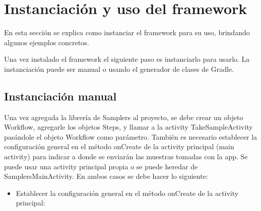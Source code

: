 \chapter{Instanciación  y uso del framework}
En esta sección se explica como instanciar el framework para su uso, brindando algunos ejemplos concretos.

Una vez instalado el framework el siguiente paso es instanciarlo para usarlo. La instanciación puede ser manual o usando el generador de clases de Gradle.


\section{Instanciación manual} \label{sec:instanciacion_manual}
Una vez agregada la librería de Samplers al proyecto, se debe crear un objeto Workflow, agregarle los objetos Steps, y llamar a la activity TakeSampleActivity pasándole el objeto Workflow como parámetro.
También es necesario establecer la configuración general en el método onCreate de la activity principal (main activity) para indicar a donde se enviarán las muestras tomadas con la app.
Se puede usar una activity principal propia o se puede heredar de SamplersMainActivity. En ambos casos se debe hacer lo siguiente:
\begin{itemize}
	\item Establecer la configuración general en el método onCreate de la activity principal:
\end{itemize}
	

\clearpage

